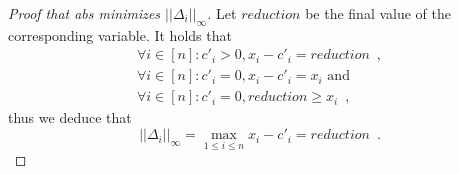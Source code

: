 \begin{proof}[Proof that abs minimizes $||\Delta_i||_{\infty}$]
  Let $reduction$ be the final value of the corresponding variable. It holds that
  \begin{equation*}
  \begin{gathered}
    \forall i \in [n] : c'_i > 0, x_i - c'_i = reduction \enspace, \\
    \forall i \in [n] : c'_i = 0, x_i - c'_i = x_i \mbox{ and} \\
    \forall i \in [n] : c'_i = 0, reduction \geq x_i \enspace,
  \end{gathered}
  \end{equation*}
  thus we deduce that
  \begin{equation*}
    ||\Delta_i||_{\infty} = \max\limits_{1 \leq i \leq n}{x_i - c'_i} = reduction \enspace.
  \end{equation*}
\end{proof}
